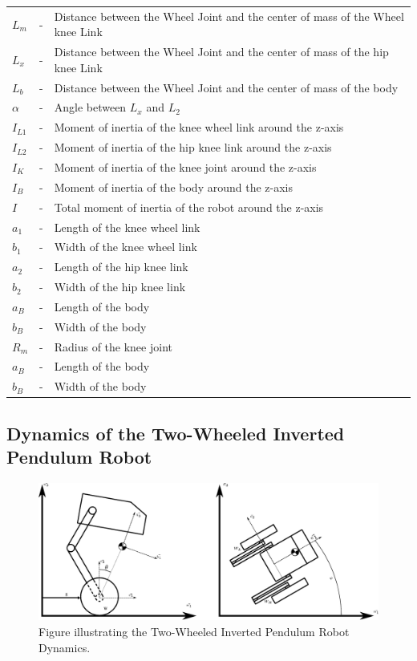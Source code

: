 \begin{table}[h!]
\begin{tabular}{lcl}
			$L_m$ & - & Distance between the Wheel Joint and the center of mass of the Wheel knee Link \\
			$L_x$ & - & Distance between the Wheel Joint and the center of mass of the hip knee Link \\
			$L_b$ & - & Distance between the Wheel Joint and the center of mass of the body \\
			$\alpha$ & - & Angle between $L_x$ and $L_2$ \\
			$I_{L1}$ & - & Moment of inertia of the knee wheel link around the z-axis \\
			$I_{L2}$ & - & Moment of inertia of the hip knee link around the z-axis \\
			$I_K$ & - & Moment of inertia of the knee joint around the z-axis \\
			$I_B$ & - & Moment of inertia of the body around the z-axis \\
			$I$ & - & Total moment of inertia of the robot around the z-axis \\
			$a_1$ & - & Length of the knee wheel link \\
			$b_1$ & - & Width of the knee wheel link \\
			$a_2$ & - & Length of the hip knee link \\
			$b_2$ & - & Width of the hip knee link \\
			$a_B$ & - & Length of the body \\
			$b_B$ & - & Width of the body \\
			$R_m$ & - & Radius of the knee joint \\
			$a_B$ & - & Length of the body \\
			$b_B$ & - & Width of the body \\
			\bottomrule
		\end{tabular}
	\end{table}
	\newpage
	\subsection{Dynamics of the Two-Wheeled Inverted Pendulum Robot}
	\begin{figure}[h]
		\centering
		\includegraphics[width=1\textwidth]{TWIPR dynamics}
		\caption[Two-Wheeled Inverted Pendulum Robot Dynamics]{Figure illustrating the Two-Wheeled Inverted Pendulum Robot Dynamics.}
		\label{fig:Two-Wheeled Inverted Pendulum Robot Dynamics}
	\end{figure}

